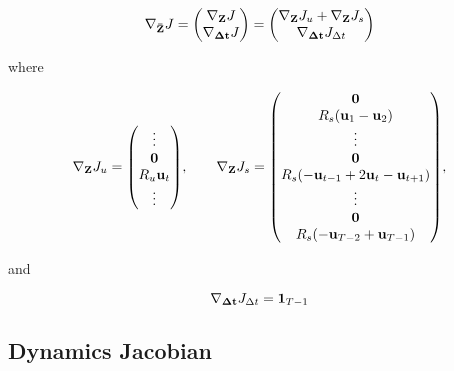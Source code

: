 \documentclass{article}
\begin{document}
\begin{equation}
  \nabla_{\vb{\bar Z}} J = \mqty(
    \nabla_{\vb{Z}} J \\
    \nabla_{\vb{\Delta \vb{t}}} J
  ) = \mqty(
    \nabla_{\vb{Z}} J_u + \nabla_{\vb{Z}} J_s \\
    \nabla_{\vb{\Delta \vb{t}}} J_{\Delta t}
  )
\end{equation}

where 

\begin{equation}
  \nabla_{\vb{Z}} J_u = \mqty(
    \vdots \\ 
    \vb{0} \\
    R_u \vb{u}_t \\  
    \vdots \\ 
  ), 
  \quad \quad
  \nabla_{\vb{Z}} J_s = 
  \mqty(
    \vb{0} \\
    R_s \qty(\vb{u}_1 - \vb{u}_2) \\  
    \vdots \\ 
    \vb{0} \\
    R_s \qty(-\vb{u}_{t-1} + 2\vb{u}_t - \vb{u}_{t+1}) \\
    \vdots \\
    \vb{0} \\
    R_s \qty(-\vb{u}_{T-2} + \vb{u}_{T-1})
  ),
\end{equation}

and

\begin{equation}
  \nabla_{\vb{\Delta \vb{t}}} J_{\Delta t} = \vb{1}_{T-1}
\end{equation}





\subsection{Dynamics Jacobian}
\end{document}
